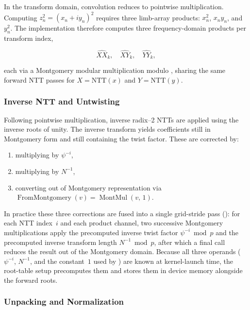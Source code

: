 In the transform domain, convolution reduces to pointwise multiplication.
Computing $z_n^2 = (x_n + iy_n)^2$ requires three limb-array products:
$x_n^2$, $x_n y_n$, and $y_n^2$.  The implementation therefore computes
three frequency-domain products per transform index,

\[
\widehat{XX}_k,\quad \widehat{XY}_k,\quad \widehat{YY}_k,
\]

each via a Montgomery modular multiplication modulo ,
sharing the same forward NTT passes for $X = \mathrm{NTT}(x)$ and
$Y = \mathrm{NTT}(y)$.

\subsubsection{Inverse NTT and Untwisting}

Following pointwise multiplication, inverse radix--2 NTTs are applied using the
inverse roots of unity. The inverse transform yields coefficients still in
Montgomery form and still containing the twist factor. These are corrected by:

\begin{enumerate}
\item multiplying by $\psi^{-i}$,
\item multiplying by $N^{-1}$,
\item converting out of Montgomery representation via
      $\operatorname{FromMontgomery}(v) = \operatorname{MontMul}(v,\,1)$.
\end{enumerate}

\noindent
In practice these three corrections are fused into a single grid-stride pass
():
for each NTT index~$i$ and each product channel, two successive Montgomery
multiplications apply the precomputed inverse twist factor
$\psi^{-i}\bmod p$ and the precomputed inverse transform length
$N^{-1}\bmod p$, after which a final  call reduces
the result out of the Montgomery domain.  Because all three operands
($\psi^{-i}$, $N^{-1}$, and the constant~$1$ used by
) are known at kernel-launch time, the root-table
setup precomputes them and stores them in device memory alongside the
forward roots.

\subsubsection{Unpacking and Normalization}
\label{subsec:unpack-normalize}

